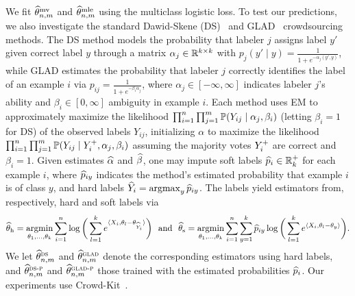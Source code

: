 We fit $\widehat{\theta}^{\textup{mv}}_{n,m}$ and
$\widehat{\theta}^{\textup{mle}}_{n,m}$ using the multiclass logistic loss.
%
To test our predictions, we also investigate the standard
Dawid-Skene (DS)~\cite{DawidSk79} and GLAD~\cite{WhitehillWuBeMoRu09}
crowdsourcing methods.
%
The DS method models the probability that labeler $j$ assigns label $y'$
given correct label $y$ through a matrix $\alpha_j \in \mathbb{R}^{k \times k}$ with
$p_j(y' \mid y) = \frac{1}{1 + e^{-\alpha_j(y', y)}}$, while GLAD estimates
the probability that labeler $j$ correctly identifies the label of an
example $i$ via $p_{ij} = \frac{1}{1 + e^{-\beta_i \alpha_j}}$, where
$\alpha_j \in [-\infty,\infty]$ indicates labeler $j$'s ability and
$\beta_i \in [0, \infty]$ ambiguity in example $i$.
%
Each method uses EM to approximately maximize the likelihood $\prod_{i =
  1}^n \prod_{j = 1}^m \mathbb{P}(Y_{ij} \mid \alpha_j, \beta_i)$ (letting
$\beta_i = 1$ for DS) of the observed labels $Y_{ij}$,
initializing $\alpha$ to maximize the likelihood $\prod_{i = 1}^n \prod_{j
  = 1}^m \mathbb{P}(Y_{ij} \mid Y^+_i, \alpha_j, \beta_i)$ assuming the majority
votes $Y^+_i$ are correct and $\beta_i = 1$.
%
Given estimates $\widehat{\alpha}$ and $\widehat{\beta}$, one may impute soft
labels $\widehat{p}_i \in \mathbb{R}_k^+$ for each example $i$, where $\widehat{p}_{iy}$
indicates the method's estimated probability that example $i$ is of class
$y$, and hard labels $\widehat{Y}_i = \operatorname*{argmax}_y \widehat{p}_{iy}$.
%
The labels yield  estimators from, respectively, hard and soft labels via
\begin{equation*}
  \widehat{\theta}_{\textup{h}}
  = \operatorname*{argmin}_{\theta_1, \ldots, \theta_k}
  \sum_{i = 1}^n \log\bigg(\sum_{l = 1}^k
  e^{\langle X_i, \theta_l - \theta_{\widehat{Y}_i}\rangle}\bigg)
  ~~ \mbox{and} ~~
  \widehat{\theta}_{\textup{s}}
  = \operatorname*{argmin}_{\theta_1, \ldots, \theta_k}
  \sum_{i = 1}^n
  \sum_{y = 1}^k
  \widehat{p}_{iy} \log\bigg(\sum_{l = 1}^k
  e^{\langle X_i, \theta_l - \theta_y\rangle} \bigg).
\end{equation*}
We let $\widehat{\theta}^{\textsc{ds}}_{n,m}$
and $\widehat{\theta}^{\textsc{glad}}_{n,m}$ denote the corresponding estimators using hard labels,
and $\widehat{\theta}^{\textsc{ds-p}}_{n,m}$ and $\widehat{\theta}^{\textsc{glad-p}}_{n,m}$ those trained with the estimated
probabilities $\widehat{p}_i$.
%
Our experiments use
Crowd-Kit~\citep{UstalovPaTs24}.

